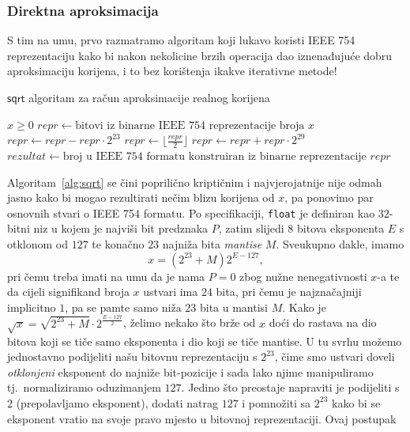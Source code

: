 \documentclass[12pt]{scrartcl}
\begin{document}
\subsubsection{Direktna aproksimacija }
S tim na umu, prvo razmatramo algoritam koji lukavo koristi IEEE 754 reprezentaciju kako bi nakon nekolicine brzih operacija dao iznenađujuće
dobru aproksimaciju korijena, i to bez korištenja ikakve iterativne metode!
\begin{algorithm}
    \caption{$\mathsf{sqrt}$ algoritam za račun aproksimacije realnog korijena~\cite{lomont}}\label{alg:sqrt}
    \begin{algorithmic}[1]
    \Require $x \geq 0$
    \State $repr \gets \text{bitovi iz binarne IEEE 754 reprezentacije broja $x$}$
    \State $repr \gets repr - repr \cdot 2^{23}$
    \State $repr \gets \lfloor\frac{repr}{2}\rfloor$
    \State $repr \gets repr + repr \cdot 2^{29}$
    \State $rezultat \gets \text{broj u IEEE 754 formatu konstruiran iz binarne reprezentacije $repr$}$
    \end{algorithmic}
\end{algorithm}
Algoritam~\ref{alg:sqrt} se čini poprilično kriptičnim i najvjerojatnije nije odmah jasno kako bi mogao rezultirati nečim blizu korijena od $x$, pa
ponovimo par osnovnih stvari o IEEE 754 formatu. Po specifikaciji, \texttt{float} je definiran kao $32$-bitni niz u kojem je najviši bit predznaka $P$,
zatim slijedi $8$ bitova eksponenta $E$ s otklonom od $127$ te konačno $23$ najniža bita \emph{mantise} $M$. Sveukupno dakle, imamo 
\begin{equation}
    x = (2^{23} + M)2^{E-127},
\end{equation}
pri čemu treba imati na umu da je nama $P=0$ zbog nužne nenegativnosti $x$-a te da
 cijeli signifikand broja $x$ ustvari ima $24$ bita, pri čemu je najznačajniji implicitno $1$, pa se pamte
samo niža $23$ bita u mantisi $M$. Kako je $\sqrt{x} = \sqrt{2^{23}+M}\cdot 2^{\frac{E-127}{2}}$, želimo nekako što brže 
od $x$ doći do rastava na dio bitova koji se tiče samo eksponenta i dio koji se tiče mantise. U tu svrhu možemo jednostavno
podijeliti našu bitovnu reprezentaciju s $2^{23}$, čime smo ustvari doveli \emph{otklonjeni} eksponent do najniže bit-pozicije i sada
lako njime manipuliramo tj.\ normaliziramo oduzimanjem $127$. Jedino što preostaje napraviti je podijeliti s $2$ (prepolavljamo eksponent),
dodati natrag $127$ i pomnožiti sa $2^{23}$ kako bi se eksponent vratio na svoje pravo mjesto u bitovnoj reprezentaciji. Ovaj postupak
\end{document}
